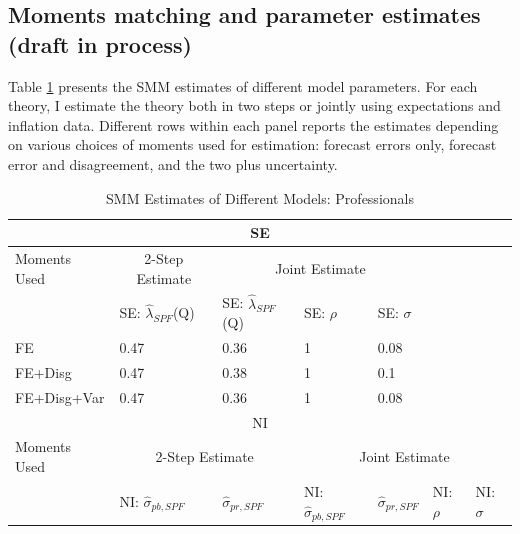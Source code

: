 \documentclass[12pt]{article}
\begin{document}
\subsection{Moments matching and parameter estimates (draft in process)}

Table \ref{SMM_Est_SPF} presents the SMM estimates of different model parameters. For each theory, I estimate the theory both in two steps or jointly using expectations and inflation data. Different rows within each panel reports the estimates depending on various choices of moments used for estimation: forecast errors only,  forecast error and disagreement, and the two plus uncertainty.  

\begin{table}[p]
	\caption{SMM Estimates of Different Models: Professionals}
	\label{SMM_Est_SPF}
	\begin{tabular}{lllllll}
		\hline 
		\multicolumn{7}{c}{SE}                            \\
		\hline 
		Moments Used & \multicolumn{1}{c}{2-Step Estimate} & \multicolumn{3}{c}{Joint Estimate}                                                 &            &              \\
			\hline 
		& SE: $\hat\lambda_{SPF}$(Q)          & SE: $\hat\lambda_{SPF}$(Q) & SE: $\rho$                & SE: $\sigma$              &            &              \\
			\hline 
		FE       & 0.47                                & 0.36                       & 1                         & 0.08                      &            &              \\
		FE+Disg      & 0.47                                & 0.38                       & 1                         & 0.1                       &            &              \\
		FE+Disg+Var  & 0.47                                & 0.36                       & 1                         & 0.08                      &            &              \\
			\hline 
		\multicolumn{7}{c}{NI}                                                                                                                                              \\
			\hline 
		Moments Used & \multicolumn{2}{c}{2-Step Estimate}                              & \multicolumn{4}{c}{Joint Estimate}              
		                                  \\
		                                  	\hline 
		& NI: $\hat\sigma_{pb,SPF}$           & $\hat\sigma_{pr,SPF}$      & NI: $\hat\sigma_{pb,SPF}$ & $\hat\sigma_{pr,SPF}$     & NI: $\rho$ & NI: $\sigma$ \\

\end{tabular}
\end{table}
\end{document}
